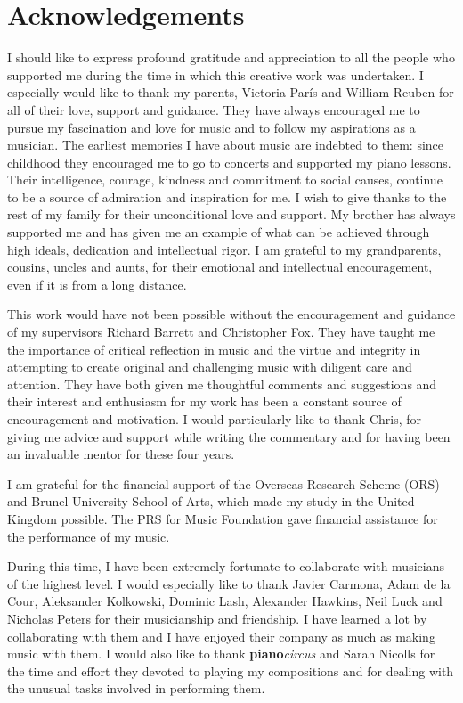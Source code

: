 \chapter*{Acknowledgements}

I should like to express profound gratitude and appreciation to all the people who supported me during the time in which this creative work was undertaken. I especially would like to thank my parents, Victoria Par\'{i}s and William Reuben for all of their love, support and guidance. They have always encouraged me to pursue my fascination and love for music and to follow my aspirations as a musician. The earliest memories I have about music are indebted to them: since childhood they encouraged me to go to concerts and supported my piano lessons. Their intelligence, courage, kindness and commitment to social causes, continue to be a source of admiration and inspiration for me. I wish to give thanks to the rest of my family for their unconditional love and support. My brother has always supported me and has given me an example of what can be achieved through high ideals, dedication and intellectual rigor. I am grateful to my grandparents, cousins, uncles and aunts, for their emotional and intellectual encouragement, even if it is from a long distance.

This work would have not been possible without the encouragement and guidance of my supervisors Richard Barrett and Christopher Fox. They have taught me the importance of  critical reflection in music and the virtue and integrity in attempting to create original and challenging music with diligent care and attention. They have both given me thoughtful comments and suggestions and their interest and enthusiasm for my work has been a constant source of encouragement and motivation. I would particularly like to thank Chris, for giving me advice and support while writing the commentary and for having been an invaluable mentor for these four years.

I am grateful for the financial support of the Overseas Research Scheme (ORS) and Brunel University School of Arts, which made my study in the United Kingdom possible. The PRS for Music Foundation gave financial assistance for the performance of my music.

During this time, I have been extremely fortunate to collaborate with musicians of the highest level. I would especially like to thank Javier Carmona, Adam de la Cour, Aleksander Kolkowski, Dominic Lash, Alexander Hawkins, Neil Luck and Nicholas Peters for their musicianship and friendship. I have learned a lot by collaborating with them and I have enjoyed their company as much as making music with them. I would also like to thank \textbf{piano}\emph{circus} and Sarah Nicolls for the time and effort they devoted to playing my compositions and for dealing with the unusual tasks involved in performing them.
 
